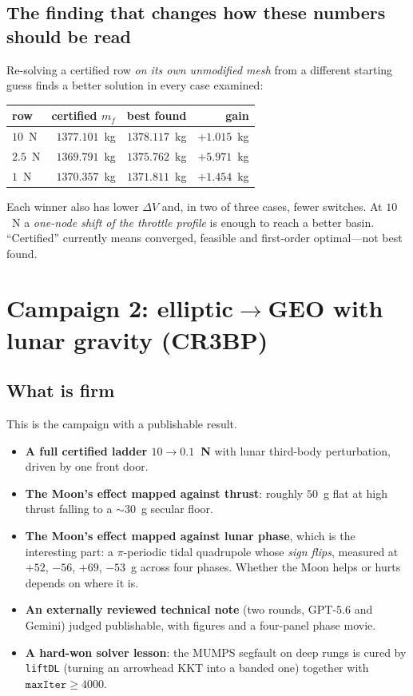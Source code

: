 \documentclass[11pt]{article}
\newcommand{\mf}{m_f}
\newcommand{\dV}{\Delta V}
\newcommand{\camp}[1]{\texttt{#1}}
\begin{document}
\subsection{The finding that changes how these numbers should be read}

Re-solving a certified row \emph{on its own unmodified mesh} from a different
starting guess finds a better solution in every case examined:

\begin{table}[h]
\centering\small
\begin{tabular}{lrrr}
\toprule
row & certified $\mf$ & best found & gain \\
\midrule
$10$~N  & $1377.101$~kg & $1378.117$~kg & $+1.015$~kg \\
$2.5$~N & $1369.791$~kg & $1375.762$~kg & $+5.971$~kg \\
$1$~N   & $1370.357$~kg & $1371.811$~kg & $+1.454$~kg \\
\bottomrule
\end{tabular}
\end{table}

Each winner also has lower $\dV$ and, in two of three cases, fewer switches. At
$10$~N a \emph{one-node shift of the throttle profile} is enough to reach a
better basin. ``Certified'' currently means converged, feasible and
first-order optimal---not best found.

\section{Campaign 2: elliptic$\to$GEO with lunar gravity (CR3BP)}

\subsection{What is firm}

This is the campaign with a publishable result.

\begin{itemize}
  \item \textbf{A full certified ladder $10\to0.1$~N} with lunar third-body
  perturbation, driven by one front door.
  \item \textbf{The Moon's effect mapped against thrust}: roughly $50$~g flat
  at high thrust falling to a $\sim\!30$~g secular floor.
  \item \textbf{The Moon's effect mapped against lunar phase}, which is the
  interesting part: a $\pi$-periodic tidal quadrupole whose \emph{sign flips},
  measured at $+52$, $-56$, $+69$, $-53$~g across four phases. Whether the Moon
  helps or hurts depends on where it is.
  \item \textbf{An externally reviewed technical note} (two rounds, GPT-5.6 and
  Gemini) judged publishable, with figures and a four-panel phase movie.
  \item \textbf{A hard-won solver lesson}: the MUMPS segfault on deep rungs is
  cured by \camp{liftDL} (turning an arrowhead KKT into a banded one) together
  with $\camp{maxIter}\ge4000$.
\end{itemize}
\end{document}
